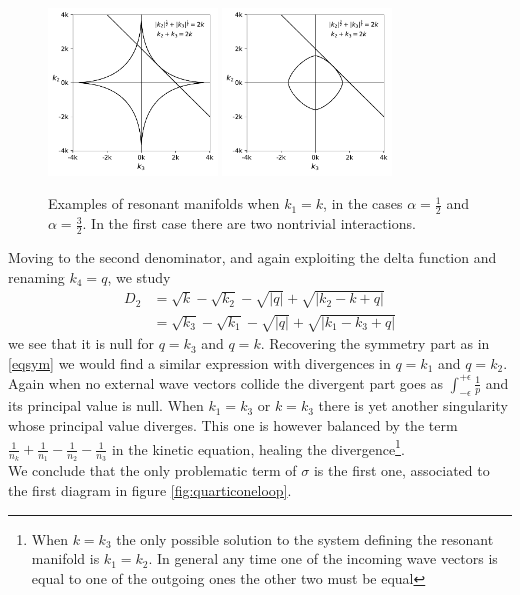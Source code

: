     \begin{figure}[ht]
        \centering
        \includegraphics[width=0.4\textwidth]{images/nonlocal_resonances_convex.pdf}
        \includegraphics[width=0.4\textwidth]{images/nonlocal_resonances_concave.pdf}
        \caption{Examples of resonant manifolds when $k_1 = k$, in the cases $\alpha = \frac{1}{2}$ and $\alpha = \frac{3}{2}$. In the first case there are two nontrivial interactions.}
        \label{fig:nonlocal}
    \end{figure}
    Moving to the second denominator, and again exploiting the delta function and renaming $k_4 = q$, we study
    \begin{equation}
        \begin{aligned}
      D_2 &= \sqrt{k} - \sqrt{k_2} - \sqrt{|q|} + \sqrt{|k_2-k + q|} \\
      &= \sqrt{k_3} - \sqrt{k_1} - \sqrt{|q|} + \sqrt{|k_1-k_3 + q|}
        \end{aligned}
    \end{equation}
    we see that it is null for $q = k_3$ and $q = k$. Recovering the symmetry part as in \eqref{eqsym} we would find a similar expression with divergences in $q = k_1$ and $q = k_2$. \\
    Again when no external wave vectors collide the divergent part goes as $\int_{-\epsilon}^{+\epsilon}\frac{1}{p}$ and its principal value is null. When $k_1 = k_3$ or $k = k_3$ there is yet another singularity whose principal value diverges. This one is however balanced by the term $\frac{1}{n_k} + \frac{1}{n_1} -\frac{1}{n_2} -\frac{1}{n_3}$ in the kinetic equation, healing the divergence\footnote{
    When $k = k_3$ the only possible solution to the system defining the resonant manifold is $k_1 = k_2$.
    In general any time one of the incoming wave vectors is equal to one of the outgoing ones the other two must be equal}.\\
    We conclude that the only problematic term of $\sigma$ is the first one, associated to the first diagram in figure \ref{fig:quarticoneloop}. \\
    
